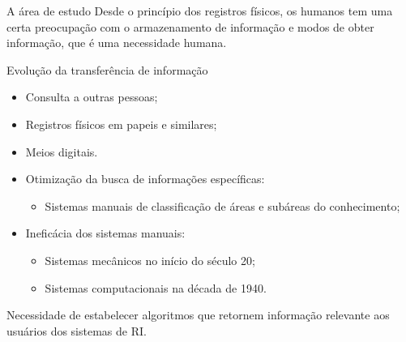 \documentclass[%
  10pt,%
  aspectratio = 169,%
  compress,%
  t,%
]{beamer}%
\begin{document}
    \begin{frame}{}{A área de estudo}
        Desde o princípio dos registros físicos, os humanos tem uma certa preocupação com o armazenamento de informação e modos de obter informação, que é uma necessidade humana.

        \begin{block}{Evolução da transferência de informação}
            \begin{itemize}
                \item Consulta a outras pessoas;
                \item Registros físicos em papeis e similares;
                \item Meios digitais.
            \end{itemize}
        \end{block}

        \begin{itemize}
            \item Otimização da busca de informações específicas:
            \begin{itemize}
                \item Sistemas manuais de classificação de áreas e subáreas do conhecimento;
            \end{itemize}
            \item Ineficácia dos sistemas manuais:
            \begin{itemize}
                \item Sistemas mecânicos no início do século 20;
                \item Sistemas computacionais na década de 1940.
            \end{itemize}
        \end{itemize}


        Necessidade de estabelecer algoritmos que retornem informação relevante aos usuários dos sistemas de RI.
    \end{frame}
\end{document}
